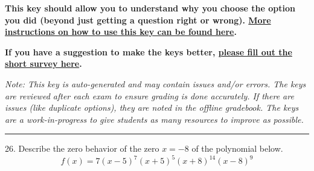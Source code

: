 \documentclass{extbook}[14pt]
\begin{document}
\textbf{This key should allow you to understand why you choose the option you did (beyond just getting a question right or wrong). \href{https://xronos.clas.ufl.edu/mac1105spring2020/courseDescriptionAndMisc/Exams/LearningFromResults}{More instructions on how to use this key can be found here}.}

\textbf{If you have a suggestion to make the keys better, \href{https://forms.gle/CZkbZmPbC9XALEE88}{please fill out the short survey here}.}

\textit{Note: This key is auto-generated and may contain issues and/or errors. The keys are reviewed after each exam to ensure grading is done accurately. If there are issues (like duplicate options), they are noted in the offline gradebook. The keys are a work-in-progress to give students as many resources to improve as possible.}

\rule{\textwidth}{0.4pt}

26. Describe the zero behavior of the zero $x = -8$ of the polynomial below.
\[ f(x) = 7(x - 5)^{7}(x + 5)^{5}(x + 8)^{14}(x - 8)^{9} \] 
\end{document}
